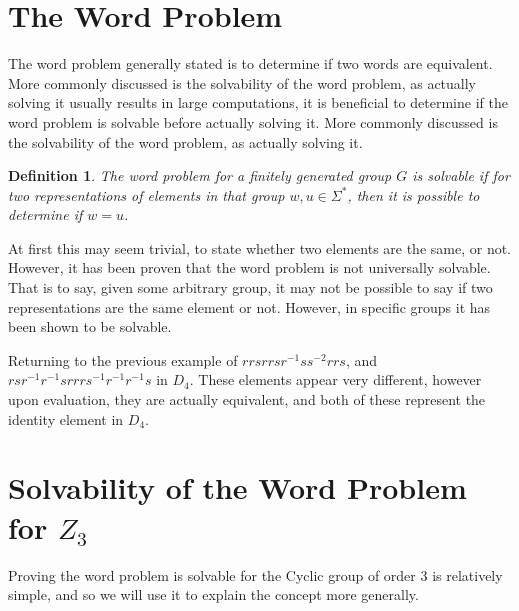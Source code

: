 \documentclass[10pt]{amsart}
\newtheorem{idefinition}{Definition}
\theoremstyle{definition}
\theoremstyle{remark}
\newenvironment{definition}{\begin{center}\begin{minipage}{0.9\textwidth}\begin{idefinition}}{\end{idefinition}\end{minipage}\end{center}}
\begin{document}
\section{The Word Problem}%
\label{sec:The Word Problem}

The word problem generally stated is to determine if two words are equivalent.
More commonly discussed is the solvability of the word problem, as actually
solving it usually results in large computations, it is beneficial to determine
if the word problem is solvable before actually solving it. More commonly
discussed is the solvability of the word problem, as actually solving it.

\begin{definition}
  The word problem for a finitely generated group $G$ is solvable if for two
  representations of elements in that group $w,u\in\Sigma^*$, then it is
  possible to determine if $w=u$.
\end{definition}

At first this may seem trivial, to state whether two elements are the same, or
not. However, it has been proven that the word problem is not universally
solvable. That is to say, given some arbitrary group, it may not be possible to
say if two representations are the same element or not. However, in specific
groups it has been shown to be solvable.

Returning to the previous example of $rrsrrsr^{-1}ss^{-2}rrs$, and
$rsr^{-1}r^{-1}srrrs^{-1}r^{-1}r^{-1}s$ in $D_4$. These elements appear very
different, however upon evaluation, they are actually equivalent, and both of
these represent the identity element in $D_4$.

\section{Solvability of the Word Problem for $Z_3$}%
\label{sec:Solvability of the Word Problem for $Z_3$}

Proving the word problem is solvable for the Cyclic group of order 3 is
relatively simple, and so we will use it to explain the concept more generally.
\end{document}

